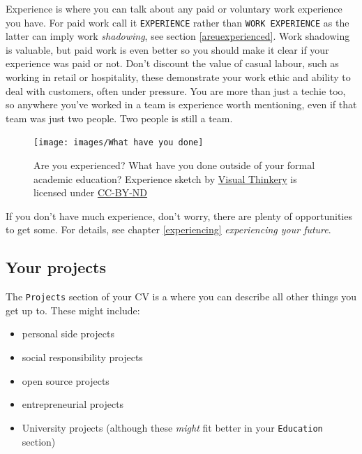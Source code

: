 \documentclass[
]{book}
\providecommand{\tightlist}{%
  \setlength{\itemsep}{0pt}\setlength{\parskip}{0pt}}
\begin{document}
Experience is where you can talk about any paid or voluntary work experience you have. For paid work call it \texttt{EXPERIENCE} rather than \texttt{WORK\ EXPERIENCE} as the latter can imply work \emph{shadowing}, see section \ref{areuexperienced}. Work shadowing is valuable, but paid work is even better so you should make it clear if your experience was paid or not. Don't discount the value of casual labour, such as working in retail or hospitality, these demonstrate your work ethic and ability to deal with customers, often under pressure. You are more than just a techie too, so anywhere you've worked in a team is experience worth mentioning, even if that team was just two people. Two people is still a team.

\begin{figure}

{\centering \texttt{[image: images/What have you done]} 

}

\caption{Are you experienced? What have you done outside of your formal academic education? Experience sketch by \href{https://visualthinkery.com/}{Visual Thinkery} is licensed under \href{https://creativecommons.org/licenses/by-nd/4.0/}{CC-BY-ND}}\label{fig:done-fig}
\end{figure}



If you don't have much experience, don't worry, there are plenty of opportunities to get some. For details, see chapter \ref{experiencing} \emph{experiencing your future}.

\hypertarget{mycvpj}{%
\subsection{Your projects}\label{mycvpj}}

The \texttt{Projects} section of your CV is a where you can describe all other things you get up to. These might include:

\begin{itemize}
\tightlist
\item
  personal side projects
\item
  social responsibility projects
\item
  open source projects
\item
  entrepreneurial projects
\item
  University projects (although these \emph{might} fit better in your \texttt{Education} section)
\end{itemize}
\end{document}
